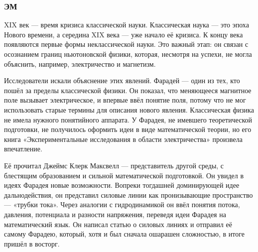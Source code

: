 
\subsubsection{ЭМ} XIX век --- время кризиса классической науки. Классическая наука --- это эпоха Нового времени, а середина XIX века --- уже начало её кризиса. К концу века появляются первые формы неклассической науки. Это важный этап: он связан с осознанием границ ньютоновской физики, которая, несмотря на успехи, не могла объяснить, например, электричество и магнетизм.

Исследователи искали объяснение этих явлений. Фарадей --- один из тех, кто пошёл за пределы классической физики. Он показал, что меняющееся магнитное поле вызывает электрическое, и впервые ввёл понятие поля, потому что не мог использовать старые термины для описания нового явления. Классическая физика не имела нужного понятийного аппарата. У Фарадея, не имевшего теоретической подготовки, не получилось оформить идеи в виде математической теории, но его книга «Экспериментальные исследования в области электричества» произвела впечатление.

Её прочитал Джеймс Клерк Максвелл --- представитель другой среды, с блестящим образованием и сильной математической подготовкой. Он увидел в идеях Фарадея новые возможности. Вопреки тогдашней доминирующей идее дальнодействия, он представил силовые линии как пронизывающие пространство --- «трубки тока». Через аналогии с гидродинамикой он ввёл понятия потока, давления, потенциала и разности напряжения, переведя идеи Фарадея на математический язык. Он написал статью о силовых линиях и отправил её самому Фарадею, который, хотя и был сначала ошарашен сложностью, в итоге пришёл в восторг.

